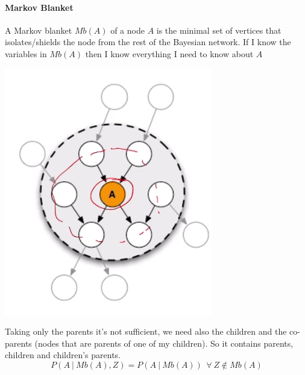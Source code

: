 \documentclass[10pt]{report}
\begin{document}
\paragraph{Markov Blanket} A Markov blanket $Mb(A)$ of a node $A$ is the minimal set of vertices that isolates/shields the node from the rest of the Bayesian network. If I know the variables in $Mb(A)$ then I know everything I need to know about $A$\begin{center}
	\includegraphics[scale=0.33]{19.png}
\end{center}
Taking only the parents it's not sufficient, we need also the children and the co-parents (nodes that are parents of one of my children). So it contains parents, children and children's parents.
$$P(A\:|\:Mb(A), Z) = P(A\:|\:Mb(A))\:\:\forall\:Z\not\in Mb(A)$$
\end{document}
